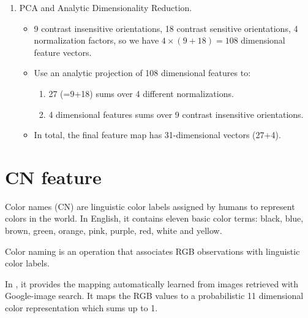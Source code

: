 \documentclass[12pt]{article}
\numberwithin{equation}{section}
\begin{document}
\begin{enumerate}
	\item PCA and Analytic Dimensionality Reduction.
		\begin{itemize}
			\item 9 contrast insensitive orientations, 18 contrast sensitive orientations, 4 normalization factors, 
			so we have $4 \times (9+18)=108$ dimensional feature vectors. 
			\item Use an analytic projection of 108 dimensional features to:
				\begin{enumerate}
			 		\item 27 (=9+18) sums over 4 different normalizations.
					\item 4 dimensional features sums over 9 contrast insensitive orientations. 
				\end{enumerate}
			\item In total, the final feature map has 31-dimensional vectors (27+4).
		\end{itemize}	
\end{enumerate}
\section{CN feature \cite{van2007learning}}
Color names (CN) are linguistic color labels assigned by humans to represent colors in the world. In English, it contains eleven basic color terms: black, blue, brown, green, orange, pink, purple, red, white and yellow. \par
Color naming is an operation that associates RGB observations with linguistic color labels.  \par
In \cite{van2007learning}, it provides the mapping automatically learned from images retrieved with Google-image search. It maps the RGB values to a probabilistic 11 dimensional color representation which sums up to 1. \par
\end{document}
